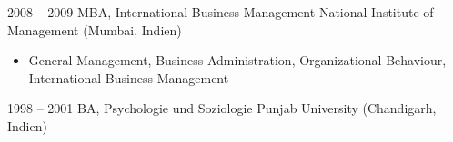 \documentclass[a4paper,]{fortysecondscv}
\begin{document}

		\begin{cvtable}[2]
			\cvitem
				{2008 -- 2009}
				{MBA, International Business Management}
				{National Institute of Management (Mumbai, Indien)}
				{	
					\begin{itemize}[nosep, leftmargin=0pt, label={}] %
						\item General Management, Business Administration, Organizational Behaviour, International Business Management 
					\end{itemize}
				}
			\cvitem
				{1998 -- 2001}
				{BA, Psychologie und Soziologie}
				{Punjab University (Chandigarh, Indien)}
				{
				}
		\end{cvtable}
\end{document}
